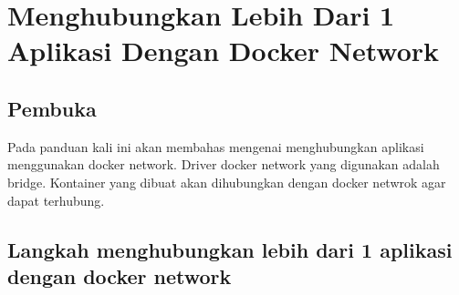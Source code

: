 \chapter{Menghubungkan Lebih Dari 1 Aplikasi Dengan Docker Network}
\section{Pembuka}
Pada panduan kali ini akan membahas mengenai menghubungkan aplikasi menggunakan docker network. Driver docker network yang digunakan adalah bridge.
Kontainer yang dibuat akan dihubungkan dengan docker netwrok agar dapat terhubung.

\section{Langkah menghubungkan lebih dari 1 aplikasi dengan docker network}
